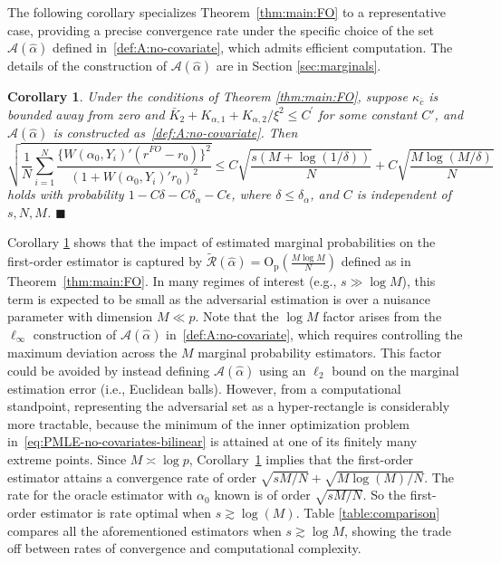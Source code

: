\documentclass[11pt]{article}
\newtheorem{corollary}{Corollary}
\newcommand{\proofend}{\hfill$\blacksquare$}
\begin{document}
The following corollary specializes Theorem~\ref{thm:main:FO} to a representative case, providing a precise convergence rate under the specific choice of the set $\mathcal{A}(\hat{\alpha})$ defined in~\eqref{def:A:no-covariate}, which admits efficient computation. The details of the construction of $\mathcal{A}(\hat\alpha)$ are in Section \ref{sec:marginals}.
\begin{corollary}\label{cor:FO}
    Under the conditions of Theorem \ref{thm:main:FO}, suppose $\kappa_{\bar{c}}$ is bounded away from zero and $\bar K_2 + K_{\alpha,1} + K_{\alpha,2}/\xi^2 \leq C^\prime$ for some constant $C'$, and $\mathcal{A}(\hat{\alpha})$ is constructed as~\eqref{def:A:no-covariate}. Then $$\displaystyle\sqrt{\frac{1}{N}\sum_{i=1}^N \frac{\{W(\alpha_0,Y_i)'(\hat r^{FO} - r_0 )\}^2}{(1+W(\alpha_0,Y_i)'r_0)^2}} \leq  C\sqrt{\frac{s(M+\log(1/\delta))}{N}} + C\sqrt{\frac{M\log(M/\delta)}{N}}$$ 
    holds with probability $1-C\delta-C\delta_\alpha-C\epsilon$, where $\delta\leq\delta_{\alpha}$, and $C$ is independent of $s,N,M$. \proofend
\end{corollary}
Corollary \ref{cor:FO} shows that the impact of estimated marginal probabilities on the first-order estimator is captured by $\widetilde{\mathcal{R}}(\hat\alpha)=\mathrm{O}_{\mathrm{p}}\left(\frac{M\log M}{N}\right)$ defined as in Theorem~\ref{thm:main:FO}. In many regimes of interest (e.g., $s \gg \log M$), this term is expected to be small as the adversarial estimation is over a nuisance parameter with dimension $M \ll p$. Note that the $\log M$ factor arises from the $\ell_\infty$ construction of $\mathcal{A}(\hat{\alpha})$ in~\eqref{def:A:no-covariate}, which requires controlling the maximum deviation across the $M$ marginal probability estimators. This factor could be avoided by instead defining $\mathcal{A}(\hat{\alpha})$ using an $\ell_2$ bound on the marginal estimation error (i.e., Euclidean balls). However, from a computational standpoint, representing the adversarial set as a hyper-rectangle is considerably more tractable, because the minimum of the inner optimization problem in~\eqref{eq:PMLE-no-covariates-bilinear} is attained at one of its finitely many extreme points. Since $M \asymp \log p$, Corollary~\ref{cor:FO} implies that the first-order estimator attains a convergence rate of order $\sqrt{sM/N}+\sqrt{M\log(M)/N}$. The rate for the oracle estimator with $\alpha_0$ known is of order $\sqrt{sM/N}$. So the first-order estimator is rate optimal when $s\gtrsim\log(M)$. Table \ref{table:comparison} compares all the aforementioned estimators when $s\gtrsim\log M$, showing the trade off between rates of convergence and computational complexity. 
\end{document}
